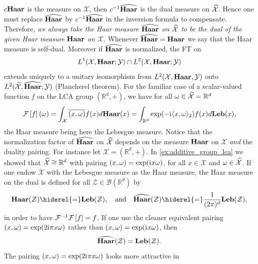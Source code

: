 $c\mathbf{Haar}$ is the measure on $\mathcal{X}$, then $c^{-1}\widehat{\mathbf{Haar}}$ is the dual
measure on $\widehat{\mathcal{X}}$. Hence one must replace $\widehat{\mathbf{Haar}}$ by
$c^{-1}\widehat{\mathbf{Haar}}$ in the inversion formula to compensate. Therefore,
\emph{we always take the Haar measure $\widehat{\mathbf{Haar}}$ on $\widehat{\mathcal{X}}$ to
be the dual of the given Haar measure $\mathbf{Haar}$ on $\mathcal{X}$}. Whenever
$\widehat{\mathbf{Haar}}=\mathbf{Haar}$ we say that the Haar measure is self-dual. Moreover if
$\widehat{\mathbf{Haar}}$ is normalized, the \acl{FT} on
\begin{dmath*}
    L^1(\mathcal{X},\Haar;\mathcal{Y})\cap L^2(\mathcal{X},\Haar;\mathcal{Y})
\end{dmath*}
extends uniquely to a unitary isomorphism from $L^2(\mathcal{X}, \mathbf{Haar},
\mathcal{Y})$ onto $L^2(\widehat{\mathcal{X}}, \widehat{\mathbf{Haar}}; \mathcal{Y})$
(Plancherel theorem). For the familiar case of a scalar-valued function $f$ on
the \ac{LCA} group $(\mathbb{R}^d, +)$, we have for all $\omega\in
\widehat{\mathcal{X}}=\mathbb{R}^d$
\begin{dmath}
    \label{fourier-R-plus}
    \FT{f}(\omega)
    =\int_{\mathcal{X}} \conj{\pairing{x,\omega}}f(x)d\Haar(x)
    =\int_{\mathbb{R}^d} \exp(-\iu \inner{x,\omega}_2)f(x) d\Leb(x),
\end{dmath}
the Haar measure being here the Lebesgue measure. Notice that the normalization
factor of $\widehat{\mathbf{Haar}}$ on $\widehat{\mathcal{X}}$ depends on the measure $\mathbf{Haar}$
on $\mathcal{X}$ \emph{and} the duality pairing. For instance let
$\mathcal{X}=(\mathbb{R}^d, +)$. In \cref{ex:additive_group_lca} we showed that
$\widehat{\mathcal{X}}\cong\mathbb{R}^d$ with pairing $(x,\omega)=\exp({\mathrm{i}\mkern1mu}
x\omega)$, for all $x\in\mathcal{X}$ and $\omega\in\widehat{\mathcal{X}}$.
If one endow $\mathcal{X}$ with the Lebesgue measure as the Haar measure, the
Haar measure on the dual is defined for all
$\mathcal{Z}\in\mathcal{B}(\mathbb{R}^d)$ by
\begin{dmath*}
    \Haar(\mathcal{Z})\hiderel{=}\Leb(\mathcal{Z}),
    \quad\text{and}\quad
    \dual{\Haar}(\mathcal{Z})\hiderel{=}\frac{1}{(2\pi)^d}\Leb(\mathcal{Z}),
\end{dmath*}
in order to have $\mathcal{F}^{-1}\mathcal{F}\left[f\right]=f$. If one use the cleaner equivalent
pairing $(x,\omega)=\exp(2{\mathrm{i}\mkern1mu}\pi x\omega)$ rather than
$(x,\omega)=\exp({\mathrm{i}\mkern1mu} x\omega)$, then
\begin{dmath*}
    \dual{\Haar}(\mathcal{Z})=\Leb(\mathcal{Z}).
\end{dmath*}
The pairing $(x,\omega)=\exp(2{\mathrm{i}\mkern1mu}\pi x\omega)$ looks more attractive in
